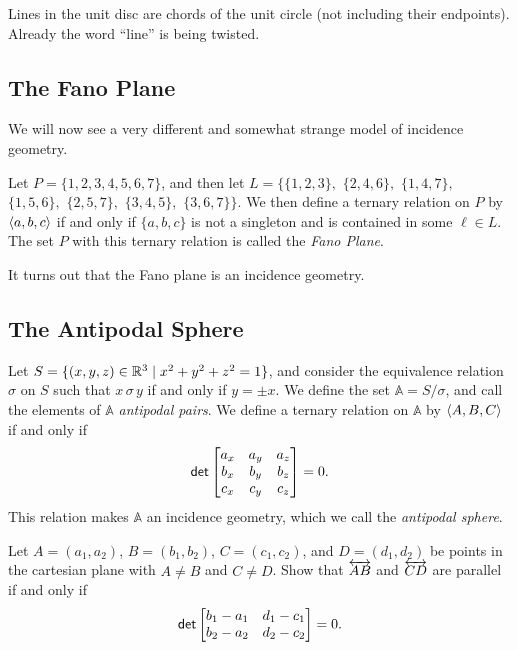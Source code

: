 Lines in the unit disc are chords of the unit circle (not including their endpoints).
Already the word ``line'' is being twisted.


\subsection{The Fano Plane}

We will now see a very different and somewhat strange model of incidence geometry.

\begin{dfn}
Let \(P = \{1,2,3,4,5,6,7\}\), and then let \(L = \{\{1,2,3\},\) \(\{2,4,6\},\) \(\{1,4,7\},\) \(\{1,5,6\},\) \(\{2,5,7\},\) \(\{3,4,5\},\) \(\{3,6,7\}\}\).
We then define a ternary relation on \(P\) by \(\langle a, b, c \rangle\) if and only if \(\{a,b,c\}\) is not a singleton and is contained in some \(\ell \in L\).
The set \(P\) with this ternary relation is called the \emph{Fano Plane}.
\end{dfn}

It turns out that the Fano plane is an incidence geometry.



\subsection{The Antipodal Sphere}

\begin{dfn}
Let \(S = \{ (x,y,z) \in \mathbb{R}^3 \mid x^2 + y^2 + z^2 = 1 \}\), and consider the equivalence relation \(\sigma\) on \(S\) such that \(x \,\sigma\, y\) if and only if \(y = \pm x\).
We define the set \(\mathbb{A} = S/\sigma\), and call the elements of \(\mathbb{A}\) \emph{antipodal pairs}.
We define a ternary relation on \(\mathbb{A}\) by \(\langle A, B, C \rangle\) if and only if \[ \mathsf{det} \begin{bmatrix} a_x & a_y & a_z \\ b_x & b_y & b_z \\ c_x & c_y & c_z \end{bmatrix} = 0. \] This relation makes \(\mathbb{A}\) an incidence geometry, which we call the \emph{antipodal sphere}.
\end{dfn}



\Exercises%

\begin{exercise} \label{exerc:parallels-in-rr2}
Let \(A = (a_1,a_2)\), \(B = (b_1,b_2)\), \(C = (c_1,c_2)\), and \(D = (d_1,d_2)\) be points in the cartesian plane with \(A \neq B\) and \(C \neq D\).
Show that \(\overleftrightarrow{AB}\) and \(\overleftrightarrow{CD}\) are parallel if and only if \[ \mathsf{det} \begin{bmatrix} b_1 - a_1 & d_1 - c_1 \\ b_2 - a_2 & d_2 - c_2 \end{bmatrix} = 0. \]
\end{exercise}


